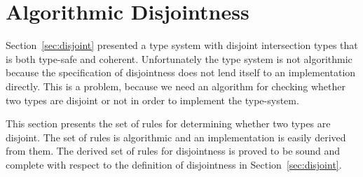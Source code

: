 \section{Algorithmic Disjointness} \label{sec:alg-dis}

Section~\ref{sec:disjoint} presented a type system with disjoint
intersection types that is both type-safe
and coherent. Unfortunately the type system is not algorithmic
because the specification of disjointness does not lend itself to an
implementation directly. This is a problem, because we need an
algorithm for checking whether two types are disjoint or not in order
to implement the type-system.


This section presents the set of rules for determining whether two
types are disjoint. The set of rules is algorithmic and an
implementation is easily derived from them. The derived
set of rules for disjointness is proved to be sound and complete with
respect to the definition of disjointness in
Section~\ref{sec:disjoint}.

